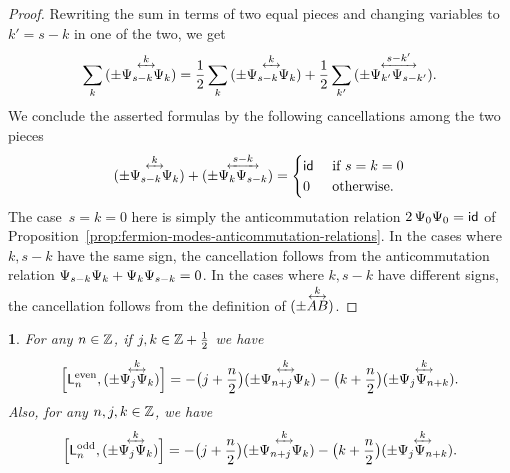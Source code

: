 \documentclass[12pt,oneside,english]{amsart}
\numberwithin{equation}{section}
\numberwithin{figure}{section}
\theoremstyle{plain}
\theoremstyle{plain}
\theoremstyle{plain}
\theoremstyle{plain}
\newtheorem{lem}[thm]{\protect\lemmaname}
\theoremstyle{remark}
\theoremstyle{definition}
\theoremstyle{plain}
\theoremstyle{plain}
\numberwithin{thm}{section}
\providecommand{\lemmaname}{Lemma}
\providecommand{\lemmaname}{Lemma}
\providecommand{\lemmaname}{Lemma}
\providecommand{\lemmaname}{Lemma}
\begin{document}
\begin{proof}
Rewriting the sum in terms of two equal pieces and changing variables
to~$k' = s-k$ 
in one of the two, we get
\begin{align*}
\sum_{k} \ourforder{\fermmode_{s-k}}{\fermmode_{k}}{k}
= \frac{1}{2} \sum_{k} \ourforder{\fermmode_{s-k}}{\fermmode_{k}}{k}
    + \frac{1}{2} \sum_{k'} 
            \ourforder{\fermmode_{k'}}{\fermmode_{s-k'}}{s-k'} .
\end{align*}
We conclude the
asserted formulas by the following cancellations among the two pieces
\begin{align*}
\ourforder{\fermmode_{s-k}}{\fermmode_{k}}{k}
    + \ourforder{\fermmode_{k}}{\fermmode_{s-k}}{s-k}
= \begin{cases}
  \id & \text{ if $s=k=0$} \\
  0 & \text{ otherwise}.
  \end{cases}
\end{align*}
The case~$s=k=0$ here is simply the anticommutation relation
$2 \, {\Psi}_{0} {\Psi}_{0} = \mathsf{id}$ of 
Proposition~\ref{prop:fermion-modes-anticommutation-relations}.
In the cases where $k, s-k$ have the same sign, the cancellation follows from
the anticommutation relation
${\Psi}_{s-k} {\Psi}_{k} + {\Psi}_{k} {\Psi}_{s-k} = 0$.
In the cases where $k, s-k$ have different signs, the cancellation follows
from the definition of $\ourforder{A}{B}{k}$.
\end{proof}
\begin{lem}
\label{lem:commutation-vir-fermion}
For any $n\in\mathbb{Z} $, if
$j,k\in\mathbb{Z} +\frac{1}{2}$ we have 
\[
\Big[ \virL{n}^{\abbrEven}, \ourforder{\fermmode_{j}}{\fermmode_{k}}{k} \Big]
= - \big( j+\frac{n}{2} \big)
      \ourforder{\fermmode_{n+j}}{\fermmode_{k}}{k}
  - \big( k+\frac{n}{2} \big)
      \ourforder{\fermmode_{j}}{\fermmode_{n+k}}{k} .
\]
Also, for any $n,j,k\in\mathbb{Z} $, we have 
\[
\Big[ \virL{n}^{\abbrOdd} , \ourforder{\fermmode_{j}}{\fermmode_{k}}{k} \Big] 
= - \big( j+\frac{n}{2} \big)
      \ourforder{\fermmode_{n+j}}{\fermmode_{k}}{k}
  - \big( k+\frac{n}{2} \big)
      \ourforder{\fermmode_{j}}{\fermmode_{n+k}}{k} .
\]
\end{lem}
\end{document}
